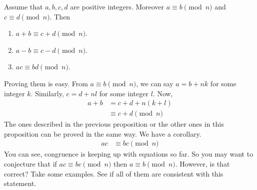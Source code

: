 \documentclass[bnt.tex]{subfile}
\begin{document}
			\begin{proposition}
				Assume that $a,b,c,d$ are positive integers. Moreover $a\equiv b\pmod n$ and $c\equiv d\pmod n$. Then
					\begin{enumerate}[(1)]
						\item $a+b\equiv c+d\pmod n$.
						\item $a-b\equiv c-d\pmod n$.
						\item $ac\equiv bd\pmod n$.
					\end{enumerate}
			\end{proposition}
		Proving them is easy. From $a\equiv b\pmod n$, we can say $a=b+nk$ for some integer $k$. Similarly, $c=d+nl$ for some integer $l$. Now,
			\begin{align*}
				a+b & = c+d+n(k+l)\\
					& \equiv c+d\pmod n
			\end{align*}
		The ones described in the previous proposition or the other ones in this proposition can be proved in the same way. We have a corollary.
			\begin{align*}
				ac & \equiv bc\pmod n
			\end{align*}
		You can see, congruence is keeping up with equations so far. So you may want to conjecture that if $ac\equiv bc\pmod n$ then $a\equiv b\pmod n$. However, is that correct? Take some examples. See if all of them are consistent with this statement.
\end{document}
